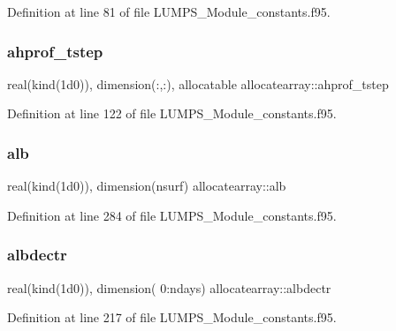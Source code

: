 Definition at line 81 of file L\+U\+M\+P\+S\+\_\+\+Module\+\_\+constants.\+f95.

\mbox{\label{namespaceallocatearray_af89bfe5fa1931abd777949bfe250cbd8}} 
\subsubsection{\texorpdfstring{ahprof\+\_\+tstep}{ahprof\_tstep}}
{\footnotesize\ttfamily real(kind(1d0)), dimension(\+:,\+:), allocatable allocatearray\+::ahprof\+\_\+tstep}



Definition at line 122 of file L\+U\+M\+P\+S\+\_\+\+Module\+\_\+constants.\+f95.

\mbox{\label{namespaceallocatearray_ad49963261e823b38b1d9e6dad29978bd}} 
\subsubsection{\texorpdfstring{alb}{alb}}
{\footnotesize\ttfamily real(kind(1d0)), dimension(nsurf) allocatearray\+::alb}



Definition at line 284 of file L\+U\+M\+P\+S\+\_\+\+Module\+\_\+constants.\+f95.

\mbox{\label{namespaceallocatearray_ac2b3eb71556f66b5cb4a91b0b0e8d6d3}} 
\subsubsection{\texorpdfstring{albdectr}{albdectr}}
{\footnotesize\ttfamily real(kind(1d0)), dimension( 0\+:ndays) allocatearray\+::albdectr}



Definition at line 217 of file L\+U\+M\+P\+S\+\_\+\+Module\+\_\+constants.\+f95.

\mbox{\label{namespaceallocatearray_a1aa983c3d70fa00f3ff15a9eee247852}} 
